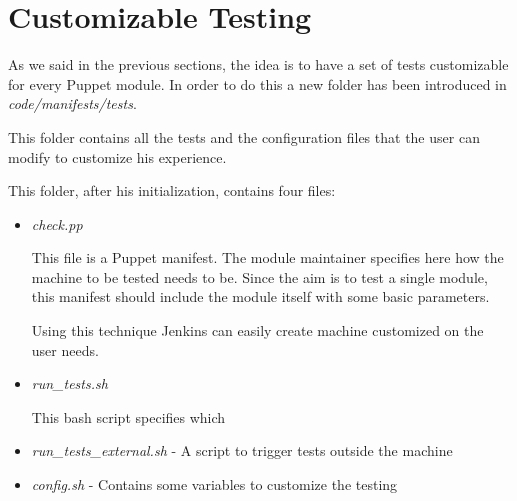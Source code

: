 \section{Customizable Testing}

As we said in the previous sections, the idea is to have a set of tests
customizable for every Puppet module. In order to do this a new folder has
been introduced in \textit{code/manifests/tests}.

This folder contains all the tests and the configuration files that the
user can modify to customize his experience.

This folder, after his initialization, contains four files:

\begin{itemize}
  \item \textit{check.pp}

This file is a Puppet manifest. The module maintainer specifies here how
the machine to be tested needs to be. Since the aim is to test a single
module, this manifest should include the module itself with some basic
parameters.

Using this technique Jenkins can easily create machine customized on the
user needs.

  \item \textit{run\_tests.sh}

This bash script specifies which

  \item \textit{run\_tests\_external.sh} - A script to trigger tests
  outside the machine



  \item \textit{config.sh} - Contains some variables to customize the testing



\end{itemize}


